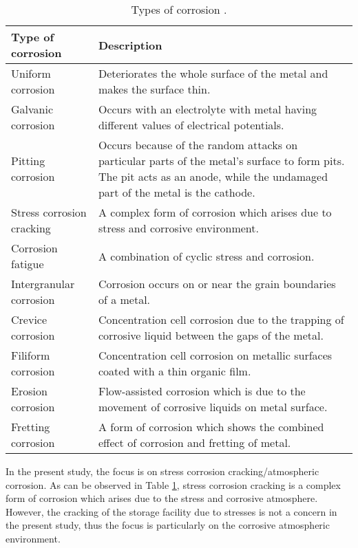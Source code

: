 \begin{table}[H]
\caption{Types of corrosion \cite{chigondo2016recent}.}

\centering
\begin{tabular}{m{} m{}}
    \hline
    Type of corrosion & Description \\
    \hline
    Uniform corrosion & Deteriorates the whole surface of the metal and makes the surface thin. \\
    Galvanic corrosion & Occurs with an electrolyte with metal having different values of electrical potentials. \\
    Pitting corrosion & Occurs because of the random attacks on particular parts of the metal’s surface to form pits. The pit acts as an anode, while the undamaged part of the metal is the cathode. \\
    Stress corrosion cracking & A complex form of corrosion which arises due to stress and  corrosive environment. \\
    Corrosion fatigue & A combination of cyclic stress and corrosion.  \\
    Intergranular corrosion & Corrosion occurs on or near the grain boundaries of a metal.  \\
    Crevice corrosion & Concentration cell corrosion due to the trapping of corrosive liquid  between the gaps of the metal. \\
    Filiform corrosion & Concentration cell corrosion on metallic surfaces coated with a thin  organic film. \\
    Erosion corrosion & Flow-assisted corrosion which is due to the movement of corrosive  liquids on metal surface. \\
    Fretting corrosion & A form of corrosion which shows the combined effect of corrosion and  fretting of metal. \\
    \hline
\end{tabular}

\label{ch3:table:corrosions}
\end{table}

In the present study, the focus is on stress corrosion cracking/atmospheric corrosion. As can be observed in Table \ref{ch3:table:corrosions}, stress corrosion cracking is a complex form of corrosion which arises due to the stress and corrosive atmosphere. However, the cracking of the storage facility due to stresses is not a concern in the present study, thus the focus is particularly on the corrosive atmospheric environment.

